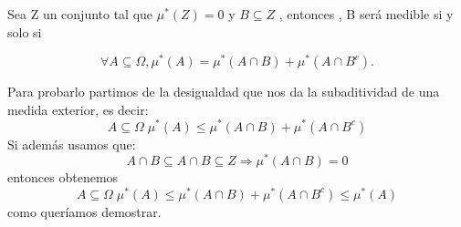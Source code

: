 
Sea Z un conjunto tal que $\mu^* (Z) = 0 $ y $B \subseteq Z$ , entonces , B ser\'a  medible si y solo si 

\[\forall A \subseteq \Omega , \mu^* (A) = \mu^* (A\cap B) + \mu^* (A \cap  B^c).\]

Para probarlo partimos de la desigualdad que nos da la subaditividad de una medida exterior, es decir:
\[A \subseteq \Omega \; \mu^* (A) \leq \mu^* (A \cap B) + \mu^* (A\cap B^c)\]
Si además usamos que: 
\[A \cap B \subseteq A \cap  B \subseteq Z \Rightarrow  \mu^* (A \cap  B) = 0\]
 entonces obtenemos 
\[A \subseteq \Omega \; \mu^* (A) \leq \mu^* (A \cap  B) + \mu^* (A\cap B^c) \leq  \mu^* (A)\] como queríamos demostrar. 